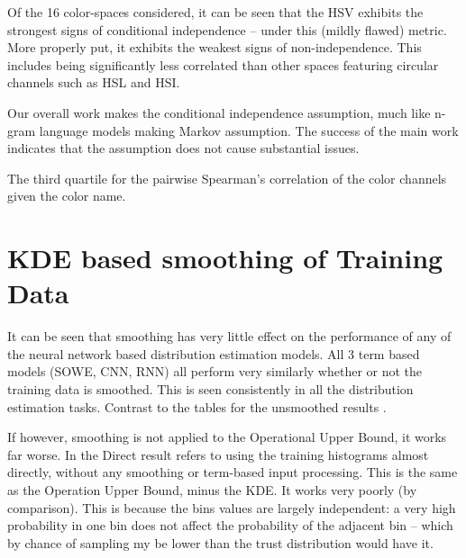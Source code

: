 \documentclass[11pt,a4paper]{article}
\begin{document}
Of the 16 color-spaces considered, it can be seen that the HSV exhibits the strongest signs of conditional independence -- under this (mildly flawed) metric.
More properly put, it exhibits the weakest signs of non-independence.
This includes being significantly less correlated than other spaces featuring circular channels such as HSL and HSI.

Our overall work makes the conditional independence assumption, much like n-gram language models making Markov assumption.
The success of the main work indicates that the assumption does not cause substantial issues.



\begin{table}
	\centering
	\caption{\label{tbl:colorcor} The third quartile for the pairwise Spearman's correlation of the color channels given the color name.}
	
\end{table}

\section{KDE based smoothing of Training Data}\label{sec:smoothed-results}

It can be seen that smoothing has very little effect on the performance of any of the neural network based distribution estimation models.
All 3 term based models (SOWE, CNN, RNN) all perform very similarly whether or not the training data is smoothed.
This is seen consistently in all the distribution estimation tasks.
Contrast 
to the tables for the unsmoothed results
.

If however, smoothing is not applied to the Operational Upper Bound, it works far worse.
In   the Direct result refers to using the training histograms almost directly, without any smoothing or term-based input processing.
This is the same as the Operation Upper Bound, minus the KDE.
It works very poorly (by comparison).
This is because the bins values are largely independent: a very high probability in one bin does not affect the probability of the adjacent bin -- which by chance of sampling my be lower than the trust distribution would have it.
\end{document}
